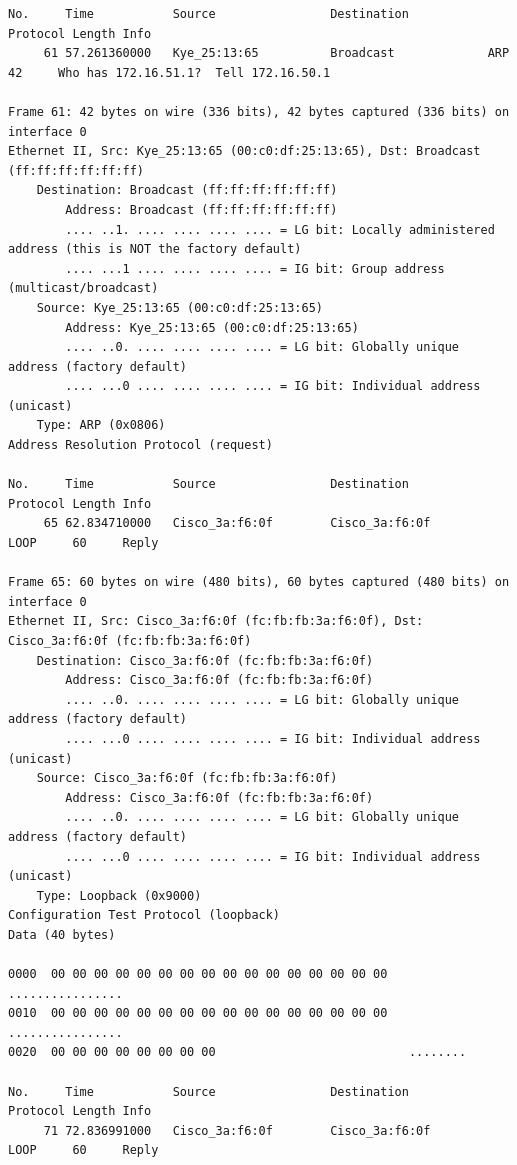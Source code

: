 \documentclass[a4paper,11pt]{article}
\begin{document}
\begin{lstlisting}
No.     Time           Source                Destination           Protocol Length Info
     61 57.261360000   Kye_25:13:65          Broadcast             ARP      42     Who has 172.16.51.1?  Tell 172.16.50.1

Frame 61: 42 bytes on wire (336 bits), 42 bytes captured (336 bits) on interface 0
Ethernet II, Src: Kye_25:13:65 (00:c0:df:25:13:65), Dst: Broadcast (ff:ff:ff:ff:ff:ff)
    Destination: Broadcast (ff:ff:ff:ff:ff:ff)
        Address: Broadcast (ff:ff:ff:ff:ff:ff)
        .... ..1. .... .... .... .... = LG bit: Locally administered address (this is NOT the factory default)
        .... ...1 .... .... .... .... = IG bit: Group address (multicast/broadcast)
    Source: Kye_25:13:65 (00:c0:df:25:13:65)
        Address: Kye_25:13:65 (00:c0:df:25:13:65)
        .... ..0. .... .... .... .... = LG bit: Globally unique address (factory default)
        .... ...0 .... .... .... .... = IG bit: Individual address (unicast)
    Type: ARP (0x0806)
Address Resolution Protocol (request)

No.     Time           Source                Destination           Protocol Length Info
     65 62.834710000   Cisco_3a:f6:0f        Cisco_3a:f6:0f        LOOP     60     Reply

Frame 65: 60 bytes on wire (480 bits), 60 bytes captured (480 bits) on interface 0
Ethernet II, Src: Cisco_3a:f6:0f (fc:fb:fb:3a:f6:0f), Dst: Cisco_3a:f6:0f (fc:fb:fb:3a:f6:0f)
    Destination: Cisco_3a:f6:0f (fc:fb:fb:3a:f6:0f)
        Address: Cisco_3a:f6:0f (fc:fb:fb:3a:f6:0f)
        .... ..0. .... .... .... .... = LG bit: Globally unique address (factory default)
        .... ...0 .... .... .... .... = IG bit: Individual address (unicast)
    Source: Cisco_3a:f6:0f (fc:fb:fb:3a:f6:0f)
        Address: Cisco_3a:f6:0f (fc:fb:fb:3a:f6:0f)
        .... ..0. .... .... .... .... = LG bit: Globally unique address (factory default)
        .... ...0 .... .... .... .... = IG bit: Individual address (unicast)
    Type: Loopback (0x9000)
Configuration Test Protocol (loopback)
Data (40 bytes)

0000  00 00 00 00 00 00 00 00 00 00 00 00 00 00 00 00   ................
0010  00 00 00 00 00 00 00 00 00 00 00 00 00 00 00 00   ................
0020  00 00 00 00 00 00 00 00                           ........

No.     Time           Source                Destination           Protocol Length Info
     71 72.836991000   Cisco_3a:f6:0f        Cisco_3a:f6:0f        LOOP     60     Reply


\end{lstlisting}
\end{document}
